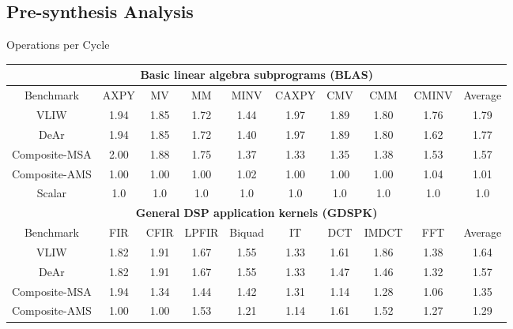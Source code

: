 \documentclass{beamer}
\begin{document}
\begin{CJK}{UTF8}{bkai}
    \subsection{Pre-synthesis Analysis}

    \begin{frame}{Operations per Cycle}
        \begin{table}[!ht]
            \centering
            \resizebox{\columnwidth}{!}
            {
                \begin{tabular}{|c|c|c|c|c|c|c|c|c|c|}
                    \hline
                    \multicolumn{10}{|c|}{\textbf{Basic linear algebra subprograms (BLAS)}} \\ \hline
                    Benchmark  &  AXPY  &  MV  &  MM  &  MINV  &  CAXPY  &  CMV  &  CMM  &  CMINV  &  Average \\ \hline 
                    VLIW  &   1.94  &   1.85  &   1.72  &   1.44  &   1.97  &   1.89  &   1.80  &   1.76  &   1.79     \\ \hline 
                    DeAr  &   1.94  &   1.85  &   1.72  &   1.40  &   1.97  &   1.89  &   1.80  &   1.62  &   1.77     \\ \hline
                    Composite-MSA  &   2.00  &   1.88  &   1.75  &   1.37  &   1.33  &   1.35  &   1.38  &   1.53  &   1.57     \\ \hline 
                    Composite-AMS  &   1.00  &   1.00  &   1.00  &   1.02  &   1.00  &   1.00  &   1.00  &   1.04  &   1.01     \\ \hline 
                    Scalar  & 1.0  & 1.0  & 1.0  & 1.0  & 1.0  & 1.0  & 1.0  & 1.0  & 1.0 \\ \hline 
                    \multicolumn{10}{|c|}{\textbf{General DSP application kernels (GDSPK)}}                     \\ \hline
                    Benchmark  &  FIR  &  CFIR  &  LPFIR  &  Biquad  &  IT  &  DCT  &  IMDCT  &  FFT  &  Average \\ \hline 
                    VLIW  &   1.82  &   1.91  &   1.67  &   1.55  &   1.33  &   1.61  &   1.86  &   1.38  &   1.64     \\ \hline 
                    DeAr  &   1.82  &   1.91  &   1.67  &   1.55  &   1.33  &   1.47  &   1.46  &   1.32  &   1.57     \\ \hline 
                    Composite-MSA  &   1.94  &   1.34  &   1.44  &   1.42  &   1.31  &   1.14  &   1.28  &   1.06  &   1.35     \\ \hline 
                    Composite-AMS  &   1.00  &   1.00  &   1.53  &   1.21  &   1.14  &   1.61  &   1.52  &   1.27  &   1.29     \\ \hline 

\end{tabular}}
\end{table}
\end{frame}
\end{CJK}
\end{document}
